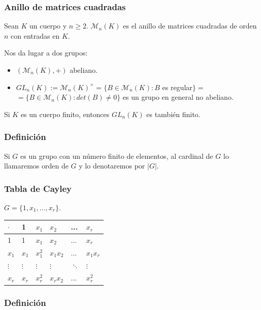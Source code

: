 \documentclass[11pt,a4paper]{article}
\begin{document}
\subsubsection*{Anillo de matrices cuadradas}

Sean $K$ un cuerpo y $n \geq 2$. $\mathcal{M}_{n}(K)$ es el anillo de matrices cuadradas de orden $n$ con entradas en $K$.

Nos da lugar a dos grupos:
\begin{itemize}
\item $(\mathcal{M}_{n}(K), +)$ abeliano.
\item $GL_{n}(K) := \mathcal{M}_{n}(K)^{\times} = \{ B \in \mathcal{M}_{n}(K): B$ es regular$\} =$ \\ $= \{B \in \mathcal{M}_{n}(K): det(B) \neq 0\}$ es un grupo en general no abeliano.
\end{itemize}

Si $K$ es un cuerpo finito, entonces $GL_{n}(K)$ es también finito.

\subsubsection*{Definición}

Si $G$ es un grupo con un número finito de elementos, al cardinal de $G$ lo llamaremos orden de $G$ y lo denotaremos por $|G|$.

\subsubsection*{Tabla de Cayley}

$G = \{1, x_{1}, ..., x_{r}\}$.

\begin{table}[ht]
\begin{tabular}{l|lllll}
$\cdot$  & 1 & $x_{1}$ & $x_{2}$ & ... & $x_{r}$ \\ \hline
1 & 1 & $x_{1}$ & $x_{2}$ & ... & $x_{r}$ \\
$x_{1}$ & $x_{1}$ & $x_{1}^{2}$ & $x_{1}x_{2}$ & ... & $x_{1}x_{r}$ \\
$\vdots$ & $\vdots$ & $\vdots$ & $\vdots$ & $\ddots$ & $\vdots$ \\
$x_{r}$ & $x_{r}$ & $x_{r}^{2}$ & $x_{r}x_{2}$ & ... & $x_{r}^{2}$
\end{tabular}
\end{table}

\newpage

\subsubsection*{Definición}
\end{document}
